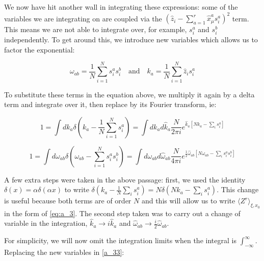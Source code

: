 We now have hit another wall in integrating these expressions: some of
the variables we are integrating on are coupled via the
$\left(\hat{z}_i - \sum_{a=1}^r \hat{x}_\mu^a s_i^a \right)^2$
term. This means we are not able to integrate over, for example,
$s_i^a$ and $s_i^b$ independently. To get around this, we introduce new variables which allows us to factor the exponential:

\begin{equation}
  \label{eq:a_36}
  \omega_{ab} = \frac{1}{N} \sum_{i=1}^N s_i^a s_i^b \quad \text{and}
  \quad k_a = \frac{1}{N} \sum_{i=1}^N \hat{z}_i s_i^a
\end{equation}

To substitute these terms in the equation above, we multiply it again by a delta term and integrate over it, then replace by its Fourier transform, ie:

\begin{equation}
  \label{eq:a_k}
  1 = \int dk_{a} \delta\left(k_a -
    \frac{1}{N}\sum_{i=1}^N s_i^a\right) = \int dk_a
  d\hat{k}_a \frac{N}{2\pi i} e^{\hat{k}_{a} [N k_a - \sum_i
      s_i^a]}  
\end{equation}

\begin{equation}
  \label{eq:a_37}
  1 = \int d\omega_{ab} \delta\left(\omega_{ab} -
    \sum_{i=1}^N s_i^a s_i^b\right) = \int d\omega_{ab}
  d\hat{\omega}_{ab} \frac{N}{4\pi i} e^{\frac{1}{2}\hat{\omega}_{ab} [N \omega_{ab} - \sum_i
      s_i^a s_i^b]}
\end{equation}


A few extra steps were taken in the above passage: first, we used the identity $\delta(x) = \alpha \delta(\alpha x)$ to write $\delta(k_a - \frac{1}{N} \sum_i s_i^a) = N \delta(N k_a - \sum_i s_i^a)$. This change is useful because both terms are of order $N$ and this will allow us to write $\langle Z^r \rangle_{\xi, x_0}$ in the form of \eqref{eq:a_3}. The second step taken was to carry out a change of variable in the integration, $\hat{k}_a \to i\hat{k}_a$ and $\hat{\omega}_{ab} \to \frac{i}{2} \hat{\omega}_{ab}$.

For simplicity, we will now omit the integration limits when the integral is $\int_{-\infty}^\infty$. Replacing the new variables in \eqref{a_33}:

